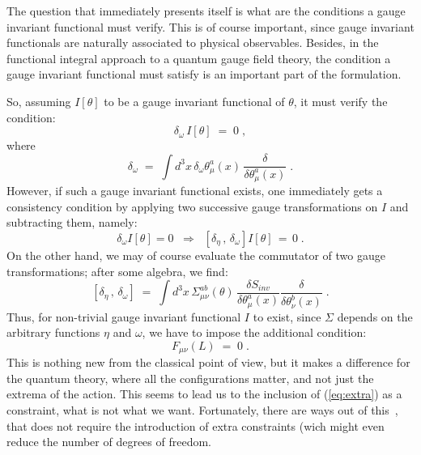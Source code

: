 \documentclass[a4paper,12pt]{article}
\begin{document}
The question that immediately presents itself is what are the
conditions a gauge invariant functional must verify. This is of course
important, since gauge invariant functionals are naturally associated
to physical observables. Besides, in the functional integral approach
to a quantum gauge field theory, the condition a gauge invariant
functional must satisfy is an important part of the formulation.

So, assuming $I[\theta]$ to be a gauge invariant
functional of $\theta$, it must verify the condition:
\begin{equation}\label{eq:ginvi}
\delta_\omega \, I[\theta] \;=\; 0 \;,
\end{equation}
where 
\begin{equation}
\delta_\omega \;=\; \int d^3x \, \delta_\omega \theta_\mu^a(x) \, 
\frac{\delta}{\delta \theta_\mu^a(x)} \;.
\end{equation}
However, if such a gauge invariant functional exists, one immediately
gets a consistency condition by applying two successive gauge
transformations on $I$ and subtracting them, namely:
\begin{equation}\label{eq:ccond}
\delta_\omega I[\theta]=0 \;\;\Rightarrow \;\; 
\left[ \delta_\eta \,,\, \delta_\omega \right] I[\theta] \,=\, 0 \;.
\end{equation}
On the other hand, we may of course evaluate the commutator of two
gauge transformations; after some algebra, we find:
\begin{equation}\label{eq:comm}
[ \delta_\eta \,,\, \delta_\omega ] \;=\; \int d^3x \,
\Sigma_{\mu\nu}^{ab}(\theta) \, \frac{\delta S_{inv}}{\delta
  \theta_\mu^a (x)}  \frac{\delta }{\delta\theta_\nu^b (x)}  \;.
\end{equation}
Thus, for non-trivial gauge invariant functional $I$ to exist, since
$\Sigma$ depends on the arbitrary functions $\eta$ and $\omega$, we
have to impose the additional condition:
\begin{equation}\label{eq:extra}
F_{\mu\nu}(L) \;=\; 0\;.
\end{equation}
This is nothing new from the classical point of view, but it makes a
difference for the quantum theory, where all the configurations
matter, and not just the extrema of the action. This seems to lead us
to the inclusion of (\ref{eq:extra}) as a constraint, what is not what
we want. Fortunately, there are ways out of this~\cite{teit}, that
does not require the introduction of  extra constraints (wich might
even reduce the number of degrees of freedom. 
\end{document}
